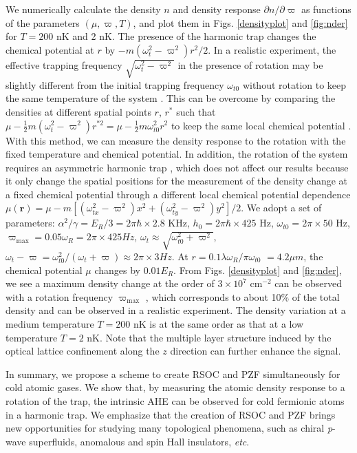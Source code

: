\documentclass[pra,twocolumn,showpacs,floatfix]{revtex4-1}
\begin{document}
We numerically calculate the density $n$ and density response $\partial
n/\partial \varpi $ as functions of the parameters $\left( \mu ,\varpi
,T\right) $, and plot them in Figs. \ref{densityplot} and \ref{fig:nder} for
$T=200$ nK and 2 nK. The presence of the harmonic trap changes the chemical
potential at $r$ by $-m\left( \omega _{t}^{2}-\varpi ^{2}\right) r^{2}/2$.
In a realistic experiment, the effective trapping frequency $\sqrt{\omega
_{t}^{2}-\varpi ^{2}}$ in the presence of rotation may be slightly different
from the initial trapping frequency $\omega _{t0}$ without rotation to keep
the same temperature of the system \cite{Ho}. This can be overcome by
comparing the densities at different spatial points $r$, $r^{\ast }$ such
that $\mu -\frac{1}{2}m\left( \omega _{t}^{2}-\varpi ^{2}\right) r^{\ast
2}=\mu -\frac{1}{2}m\omega _{t0}^{2}r^{2}$ to keep the same local chemical
potential \cite{Ho}. With this method, we can measure the density response
to the rotation with the fixed temperature and chemical potential. In
addition, the rotation of the system requires an asymmetric harmonic trap
\cite{Haljan}, which does not affect our results because it only change the
spatial positions for the measurement of the density change at a fixed
chemical potential through a different local chemical potential dependence $%
\mu \left( \mathbf{r}\right) =\mu -m[\left( \omega _{tx}^{2}-\varpi
^{2}\right) x^{2}+\left( \omega _{ty}^{2}-\varpi ^{2}\right) y^{2}]/2$. We
adopt a set of parameters: $\alpha ^{2}/\gamma =E_{R}/3=2\pi \hbar \times
2.8 $ KHz, $h_{0}=2\pi \hbar \times 425$ Hz, $\omega _{t0}=2\pi \times 50$
Hz, $\varpi _{\max }=0.05\omega _{R}=2\pi \times 425Hz$, $\omega _{t}\approx
\sqrt{\omega _{t0}^{2}+\varpi ^{2}}$, $\omega _{t}-\varpi =\omega
_{t0}^{2}/\left( \omega _{t}+\varpi \right) \approx 2\pi \times 3Hz$. At $%
r=0.1\lambda \omega _{R}/\pi \omega _{t0}$ $=4.2\mu m$, the chemical
potential $\mu $ changes by $0.01E_{R}$. From Figs. \ref{densityplot} and %
\ref{fig:nder}, we see a maximum density change at the order of $3\times
10^{7}$ cm$^{-2}$ can be observed with a rotation frequency $\varpi _{\max }$%
, which corresponds to about 10\% of the total density and can be observed
in a realistic experiment. The density variation at a medium temperature $%
T=200$ nK is at the same order as that at a low temperature $T=2$ nK. Note
that the multiple layer structure induced by the optical lattice confinement
along the $z$ direction can further enhance the signal.

In summary, we propose a scheme to create RSOC and PZF simultaneously for
cold atomic gases. We show that, by measuring the atomic density response to
a rotation of the trap, the intrinsic AHE can be observed for cold fermionic
atoms in a harmonic trap. We emphasize that the creation of RSOC and PZF
brings new opportunities for studying many topological phenomena, such as
chiral \textit{p}-wave superfluids, anomalous and spin Hall insulators,
\textit{etc}.
\end{document}
